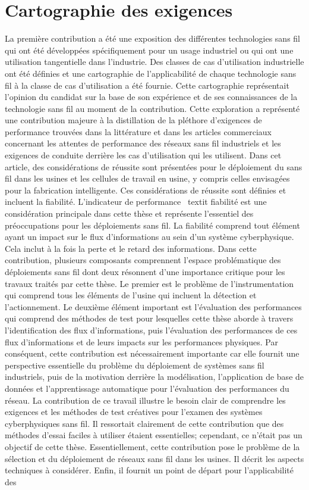 \documentclass[12pt]{article}
\begin{document}
\section*{Cartographie des exigences}

La première contribution a été une exposition des différentes technologies sans fil qui ont été développées spécifiquement pour un usage industriel ou qui ont une utilisation tangentielle dans l'industrie. Des classes de cas d'utilisation industrielle ont été définies et une cartographie de l'applicabilité de chaque technologie sans fil à la classe de cas d'utilisation a été fournie. Cette cartographie représentait l'opinion du candidat sur la base de son expérience et de ses connaissances de la technologie sans fil au moment de la contribution. Cette exploration a représenté une contribution majeure à la distillation de la pléthore d'exigences de performance trouvées dans la littérature et dans les articles commerciaux concernant les attentes de performance des réseaux sans fil industriels et les exigences de conduite derrière les cas d'utilisation qui les utilisent. Dans cet article, des considérations de réussite sont présentées pour le déploiement du sans fil dans les usines et les cellules de travail en usine, y compris celles envisagées pour la fabrication intelligente. Ces considérations de réussite sont définies et incluent la fiabilité. L'indicateur de performance \ textit {fiabilité} est une considération principale dans cette thèse et représente l'essentiel des préoccupations pour les déploiements sans fil. La fiabilité comprend tout élément ayant un impact sur le flux d'informations au sein d'un système cyberphysique. Cela inclut à la fois la perte et le retard des informations. Dans cette contribution, plusieurs composants comprennent l'espace problématique des déploiements sans fil dont deux résonnent d'une importance critique pour les travaux traités par cette thèse. Le premier est le problème de l'instrumentation qui comprend tous les éléments de l'usine qui incluent la détection et l'actionnement. Le deuxième élément important est l'évaluation des performances qui comprend des méthodes de test pour lesquelles cette thèse aborde à travers l'identification des flux d'informations, puis l'évaluation des performances de ces flux d'informations et de leurs impacts sur les performances physiques. Par conséquent, cette contribution est nécessairement importante car elle fournit une perspective essentielle du problème du déploiement de systèmes sans fil industriels, puis de la motivation derrière la modélisation, l'application de base de données et l'apprentissage automatique pour l'évaluation des performances du réseau. La contribution de ce travail illustre le besoin clair de comprendre les exigences et les méthodes de test créatives pour l'examen des systèmes cyberphysiques sans fil. Il ressortait clairement de cette contribution que des méthodes d'essai faciles à utiliser étaient essentielles; cependant, ce n'était pas un objectif de cette thèse. Essentiellement, cette contribution pose le problème de la sélection et du déploiement de réseaux sans fil dans les usines. Il décrit les aspects techniques à considérer. Enfin, il fournit un point de départ pour l'applicabilité des 
\end{document}
